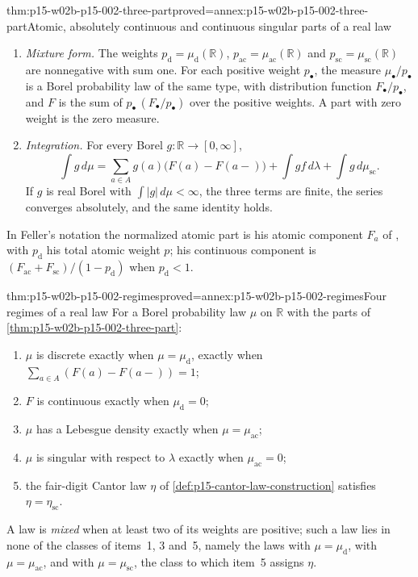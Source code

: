 \begin{hbtheorem}{thm:p15-w02b-p15-002-three-part}{proved=annex:p15-w02b-p15-002-three-part}{Atomic, absolutely continuous and continuous singular parts of a real law}
\begin{enumerate}
      atomic, absolutely continuous and continuous singular, then
      \(G_1=F_{\mathrm d}\), \(G_2=F_{\mathrm{ac}}\) and
      \(G_3=F_{\mathrm{sc}}\).
\item \emph{Mixture form.} The weights
      \(p_{\mathrm d}=\mu_{\mathrm d}(\mathbb R)\),
      \(p_{\mathrm{ac}}=\mu_{\mathrm{ac}}(\mathbb R)\) and
      \(p_{\mathrm{sc}}=\mu_{\mathrm{sc}}(\mathbb R)\) are nonnegative
      with sum one. For each positive weight \(p_\bullet\), the measure
      \(\mu_\bullet/p_\bullet\) is a Borel probability law of the same
      type, with distribution function \(F_\bullet/p_\bullet\), and
      \(F\) is the sum of \(p_\bullet\,(F_\bullet/p_\bullet)\) over the
      positive weights. A part with zero weight is the zero measure.
\item \emph{Integration.} For every Borel \(g:\mathbb R\to[0,\infty]\),
      \[
       \int g\,d\mu=\sum_{a\in A}g(a)\bigl(F(a)-F(a-)\bigr)
                    +\int gf\,d\lambda+\int g\,d\mu_{\mathrm{sc}}.
      \]
      If \(g\) is real Borel with \(\int|g|\,d\mu<\infty\), the three
      terms are finite, the series converges absolutely, and the same
      identity holds.
\end{enumerate}
\end{hbtheorem}

In Feller's notation the normalized atomic part is his atomic component
\(F_a\) of \cite[sec.~V.2, eq.~(2.4), p.~138]{Feller1971ProbabilityII},
with \(p_{\mathrm d}\) his total atomic weight \(p\); his continuous
component is \((F_{\mathrm{ac}}+F_{\mathrm{sc}})/(1-p_{\mathrm d})\) when
\(p_{\mathrm d}<1\).

\begin{hbcorollary}{thm:p15-w02b-p15-002-regimes}{proved=annex:p15-w02b-p15-002-regimes}{Four regimes of a real law}
For a Borel probability law \(\mu\) on \(\mathbb R\) with the parts of
\cref{thm:p15-w02b-p15-002-three-part}:
\begin{enumerate}
\item \(\mu\) is discrete exactly when \(\mu=\mu_{\mathrm d}\), exactly
      when \(\sum_{a\in A}(F(a)-F(a-))=1\);
\item \(F\) is continuous exactly when \(\mu_{\mathrm d}=0\);
\item \(\mu\) has a Lebesgue density exactly when \(\mu=\mu_{\mathrm{ac}}\);
\item \(\mu\) is singular with respect to \(\lambda\) exactly when
      \(\mu_{\mathrm{ac}}=0\);
\item the fair-digit Cantor law \(\eta\) of
      \cref{def:p15-cantor-law-construction} satisfies
      \(\eta=\eta_{\mathrm{sc}}\).
\end{enumerate}
A law is \emph{mixed} when at least two of its weights are positive; such
a law lies in none of the classes of items~1, 3 and~5, namely the laws with
\(\mu=\mu_{\mathrm d}\), with \(\mu=\mu_{\mathrm{ac}}\), and with
\(\mu=\mu_{\mathrm{sc}}\), the class to which item~5 assigns \(\eta\).
\end{hbcorollary}

